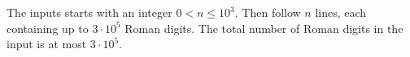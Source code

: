 

The inputs starts with an integer $0 < n \leq 10^3$. Then follow $n$ lines, each
containing up to $3 \cdot 10^5$ Roman digits. The total number
of Roman digits in the input is at most $3 \cdot 10^5$.

